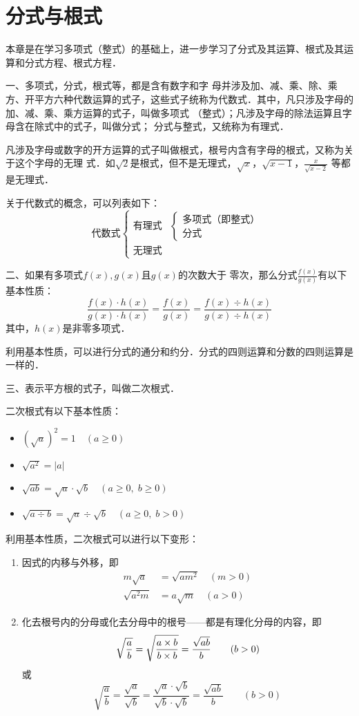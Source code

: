 \section*{分式与根式}

本章是在学习多项式（整式）的基础上，进一步学习了分式及其运算、根式及其运算和分式方程、根式方程．

一、多项式，分式，根式等，都是含有数字和字
母并涉及加、减、乘、除、乘方、开平方六种代数运算的式子，这些式子统称为代数式．其中，凡只涉及字母的加、减、乘、乘方运算的式子，叫做多项式
（整式）；凡涉及字母的除法运算且字母含在除式中的式子，叫做分式；
分式与整式，又统称为有理式．

凡涉及字母或数字的开方运算的式子叫做根式，根号内含有字母的根式，又称为关于这个字母的无理
式．如$\sqrt{2}$是根式，但不是无理式，$\sqrt{x}$，$\sqrt{x-1}$，$\frac{x}{\sqrt{x-2}}$
等都是无理式．

关于代数式的概念，可以列表如下：
\[
\text{代数式}\begin{cases}
    \text{有理式} & \begin{cases}
        \text{多项式（即整式）}\\\text{分式}
    \end{cases}\\
    \text{无理式}
\end{cases}    
\]

二、如果有多项式$f(x),g(x)$且$g(x)$的次数大于
零次，那么分式$\frac{f (x)}{g (x)}$有以下基本性质：
\[\frac{f (x) \cdot h (x)}{g(x)\cdot h(x)}=\frac{f(x)}{g (x)}=\frac{f (x) \div h (x)}{g(x)\div h(x)}\]
其中，$h(x)$是非零多项式．

利用基本性质，可以进行分式的通分和约分．分式的四则运算和分数的四则运算是一样的．

三、表示平方根的式子，叫做二次根式．

二次根式有以下基本性质：
\begin{itemize}
    \item $\left(\sqrt{a}\right)^2=1\quad (a\ge 0)$
    \item $\sqrt{a^2}=|a|$
    \item $\sqrt{ab}=\sqrt{a}\cdot \sqrt{b}\quad (a\ge 0,\; b\ge 0)$
    \item $\sqrt{a\div b}=\sqrt{a}\div \sqrt{b} \quad (a\ge 0,\; b>0)$
\end{itemize}

利用基本性质，二次根式可以进行以下变形：
\begin{enumerate}
    \item 因式的内移与外移，即
    \[\begin{split}
        m\sqrt{a}&=\sqrt{am^2}\quad (m>0)\\
        \sqrt{a^2m}&=a\sqrt{m}\quad (a>0)
    \end{split}\]
    \item 化去根号内的分母或化去分母中的根号——都是有理化分母的内容，即
\[\sqrt{\dfrac{a}{b}}=\sqrt{\dfrac{a\times b}{b\times b}}=\dfrac{\sqrt{ab}}{b}\qquad (b>0)\]
或
\[\sqrt{\frac{a}{b}}=\frac{\sqrt{a}}{\sqrt{b}}=\frac{\sqrt{a}\cdot \sqrt{b}}{\sqrt{b}\cdot \sqrt{b}}=\frac{\sqrt{ab}}{b}\qquad (b>0)\]
\end{enumerate}

